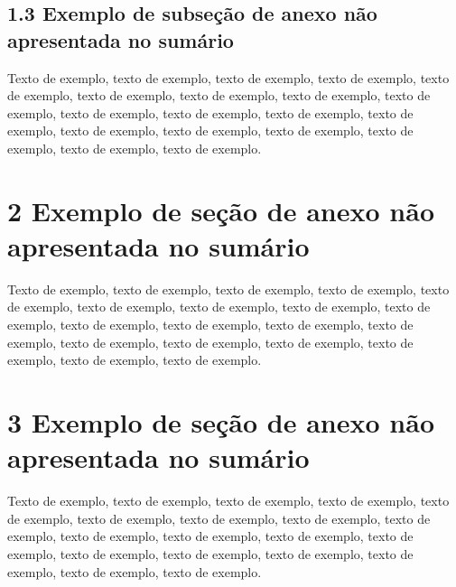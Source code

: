 \documentclass[
	12pt,				%
	oneside,			%
	a4paper,			%
	english,			%
	brazil				%
	]{abntex2ppgsi}
\begin{document}
\begin{anexosenv}
\subsection*{1.3 Exemplo de subseção de anexo não apresentada no sumário}

Texto de exemplo, texto de exemplo, texto de exemplo, texto de exemplo, texto de exemplo, texto de exemplo, texto de exemplo, texto de exemplo, texto de exemplo, texto de exemplo, texto de exemplo, texto de exemplo, texto de exemplo, texto de exemplo, texto de exemplo, texto de exemplo, texto de exemplo, texto de exemplo, texto de exemplo.

\section*{2 Exemplo de seção de anexo não apresentada no sumário}

Texto de exemplo, texto de exemplo, texto de exemplo, texto de exemplo, texto de exemplo, texto de exemplo, texto de exemplo, texto de exemplo, texto de exemplo, texto de exemplo, texto de exemplo, texto de exemplo, texto de exemplo, texto de exemplo, texto de exemplo, texto de exemplo, texto de exemplo, texto de exemplo, texto de exemplo.

\section*{3 Exemplo de seção de anexo não apresentada no sumário}

Texto de exemplo, texto de exemplo, texto de exemplo, texto de exemplo, texto de exemplo, texto de exemplo, texto de exemplo, texto de exemplo, texto de exemplo, texto de exemplo, texto de exemplo, texto de exemplo, texto de exemplo, texto de exemplo, texto de exemplo, texto de exemplo, texto de exemplo, texto de exemplo, texto de exemplo.

\end{anexosenv}

\end{document}
